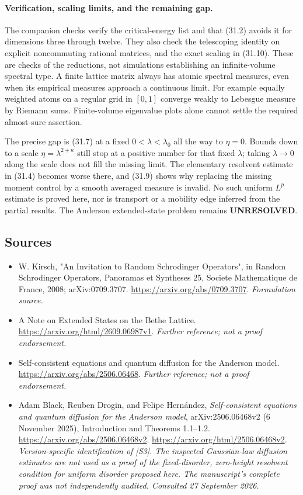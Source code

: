 \documentclass[11pt]{article}
\begin{document}
\paragraph{Verification, scaling limits, and the remaining gap.}
The companion checks verify the critical-energy list and that (31.2) avoids
it for dimensions three through twelve. They also check the telescoping
identity on explicit noncommuting rational matrices, and the exact scaling
in (31.10). These are checks of the reductions, not simulations establishing
an infinite-volume spectral type. A finite lattice matrix always has atomic
spectral measures, even when its empirical measures approach a continuous
limit. For example equally weighted atoms on a regular grid in $[0,1]$
converge weakly to Lebesgue measure by Riemann sums. Finite-volume eigenvalue
plots alone cannot settle the required almost-sure assertion.

The precise gap is (31.7) at a fixed $0<\lambda<\lambda_0$ all the way to
$\eta=0$. Bounds down to a scale $\eta=\lambda^{2+\kappa}$ still stop at a
positive number for that fixed $\lambda$; taking $\lambda\to0$ along the
scale does not fill the missing limit. The elementary resolvent estimate
in (31.4) becomes worse there, and (31.9) shows why replacing the missing
moment control by a smooth averaged measure is invalid. No such uniform
$L^p$ estimate is proved here, nor is transport or a mobility edge inferred
from the partial results. The Anderson extended-state problem remains
\textbf{UNRESOLVED}.

\subsection{Sources}
\begin{itemize}
\item[S1]W. Kirsch, "An Invitation to Random Schrodinger Operators", in Random Schrodinger Operators, Panoramas et Syntheses 25, Societe Mathematique de France, 2008; arXiv:0709.3707.
\url{https://arxiv.org/abs/0709.3707}.
\textit{Formulation source.}
\item[S2]A Note on Extended States on the Bethe Lattice.
\url{https://arxiv.org/html/2609.06987v1}.
\textit{Further reference; not a proof endorsement.}
\item[S3]Self-consistent equations and quantum diffusion for the Anderson model.
\url{https://arxiv.org/abs/2506.06468}.
\textit{Further reference; not a proof endorsement.}

\item[E1]Adam Black, Reuben Drogin, and Felipe Hern\'andez,
\emph{Self-consistent equations and quantum diffusion for the Anderson model},
arXiv:2506.06468v2 (6 November 2025), Introduction and Theorems 1.1--1.2.
\url{https://arxiv.org/abs/2506.06468v2}.
\url{https://arxiv.org/html/2506.06468v2}.
\textit{Version-specific identification of [S3]. The inspected Gaussian-law
diffusion estimates are not used as a proof of the fixed-disorder, zero-height
resolvent condition for uniform disorder proposed here. The manuscript's
complete proof was not independently audited. Consulted 27 September 2026.}
\end{itemize}
\end{document}
